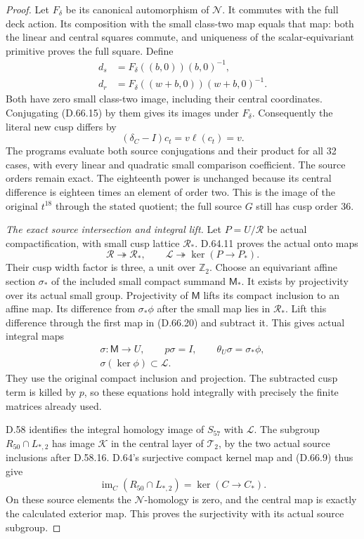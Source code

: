 \begin{proof}
Let \(F_\delta\) be its canonical automorphism of
\(\mathscr N\). It commutes with the full deck action.
Its composition with the small class-two map equals
that map: both the linear and central squares commute,
and uniqueness of the scalar-equivariant primitive
proves the full square. Define
\[
 \begin{aligned}
 d_s&=F_\delta((b,0))(b,0)^{-1},\\
 d_r&=F_\delta((w+b,0))(w+b,0)^{-1}.
 \end{aligned}
 \tag{D.66.18}
\]
Both have zero small class-two image, including their
central coordinates. Conjugating (D.66.15) by them
gives its images under \(F_\delta\). Consequently
the literal new cusp differs by
\[
                 (\delta_C-I)c_t=v\ell(c_t)=v.
 \tag{D.66.19}
\]
The programs evaluate both source conjugations and
their product for all 32 cases, with every linear
and quadratic small comparison coefficient. The
source orders remain exact. The eighteenth power
is unchanged because its central difference is
eighteen times an element of order two. This is
the image of the original \(t^{18}\) through the
stated quotient; the full source \(G\) still has
cusp order 36.

\emph{The exact source intersection and integral lift.}
Let \(P=U/\mathcal R\) be actual compactification,
with small cusp lattice \(\mathcal R_*\).
D.64.11 proves the actual onto maps
\[
 \mathcal R\twoheadrightarrow\mathcal R_*,
 \qquad\mathcal L\twoheadrightarrow\ker(P\to P_*).
 \tag{D.66.20}
\]
Their cusp width factor is three, a unit over
\(\mathbb Z_2\). Choose an equivariant affine
section \(\sigma_*\) of the included small compact
summand \(\mathsf M_*\). It exists by projectivity
over its actual small group. Projectivity of
\(\mathsf M\) lifts its compact inclusion to an
affine map. Its difference from \(\sigma_*\phi\)
after the small map lies in \(\mathcal R_*\).
Lift this difference through the first map in
(D.66.20) and subtract it. This gives actual
integral maps
\[
 \begin{gathered}
 \sigma:\mathsf M\longrightarrow U,\qquad
 p\sigma=I,\qquad
 \theta_U\sigma=\sigma_*\phi,\\
                  \sigma(\ker\phi)\subset\mathcal L.
 \end{gathered}
 \tag{D.66.21}
\]
They use the original compact inclusion and
projection. The subtracted cusp term is killed
by \(p\), so these equations hold integrally
with precisely the finite matrices already used.

D.58 identifies the integral homology image of
\(S_{57}\) with \(\mathcal L\). The subgroup
\(R_{50}\cap L_{*,2}\) has image \(\mathcal K\)
in the central layer of \(\mathcal T_2\), by the two actual source
inclusions after D.58.16. D.64's surjective
compact kernel map and (D.66.9) thus give
\[
 \operatorname{im}_{C}(R_{50}\cap L_{*,2})
                           =\ker(C\to C_*).
 \tag{D.66.22}
\]
On these source elements the \(\mathscr N\)-homology
is zero, and the central map is exactly the
calculated exterior map. This proves the
surjectivity with its actual source subgroup.


\end{proof}
